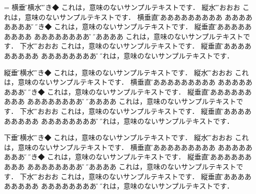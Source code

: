 \vfill\eject


=\vbox{\yoko\hsize=100mm
横垂直\H\vrule \hbox{\yoko 横水平\H }\vrule\H かき◆
これは，意味のないサンプルテキストです．
\vrule\hbox{\tate 縦水平\H }\vrule\H おおおお
これは，意味のないサンプルテキストです．\vrule
\vbox{\yoko\hsize=50mm 横垂直\H ああああああああああ%
  あああああああああ\hfill\H}%
\vrule\H かき◆
これは，意味のないサンプルテキストです．\vrule
\vbox{\tate\hsize=50mm 縦垂直\H ああああああああああ%
  あああああああああ\hfill\H}%
\vrule\H ◆ああああ
これは，意味のないサンプルテキストです．\vrule
\hbox{\dtou 下水平\H }\vrule\H おおおお
これは，意味のないサンプルテキストです．
\vrule\vbox{\dtou\hsize=50mm 縦垂直\H ああああああああああ%
  あああああああああ\hfill\H}%
\vrule\H これは，意味のないサンプルテキストです．
}
\vfill\eject

\vbox{\tate\hsize=100mm
縦垂直\H\vrule\hbox{\yoko 横水平\H }\vrule\H かき◆
これは，意味のないサンプルテキストです．
\vrule\hbox{\tate 縦水平\H }\vrule\H おおおお
これは，意味のないサンプルテキストです．\vrule
\vbox{\yoko\hsize=50mm 横垂直\H ああああああああああ%
  あああああああああ\hfill\H}%
\vrule\H かき◆
これは，意味のないサンプルテキストです．\vrule
\vbox{\tate\hsize=50mm 縦垂直\H ああああああああああ%
  あああああああああ\hfill\H}%
\vrule\H ◆ああああ
これは，意味のないサンプルテキストです．\vrule
\hbox{\dtou 下水平\H }\vrule\H おおおお
これは，意味のないサンプルテキストです．
\vrule\vbox{\dtou\hsize=50mm 縦垂直\H ああああああああああ%
  あああああああああ\hfill\H}%
\vrule\H これは，意味のないサンプルテキストです．
}
\vfill\eject

\vbox{\dtou\hsize=100mm
下垂直\H\vrule\hbox{\yoko 横水平\H }\vrule\H かき◆
これは，意味のないサンプルテキストです．
\vrule\hbox{\tate 縦水平\H }\vrule\H おおおお
これは，意味のないサンプルテキストです．\vrule
\vbox{\yoko\hsize=50mm 横垂直\H ああああああああああ%
  あああああああああ\hfill\H}%
\vrule\H かき◆
これは，意味のないサンプルテキストです．\vrule
\vbox{\tate\hsize=50mm 縦垂直\H ああああああああああ%
  あああああああああ\hfill\H}%
\vrule\H ◆ああああ
これは，意味のないサンプルテキストです．\vrule
\hbox{\dtou 下水平\H }\vrule\H おおおお
これは，意味のないサンプルテキストです．
\vrule\vbox{\dtou\hsize=50mm 縦垂直\H ああああああああああ%
  あああああああああ\hfill\H}%
\vrule\H これは，意味のないサンプルテキストです．
}


